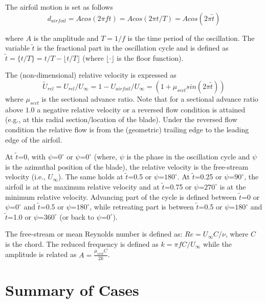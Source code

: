 The airfoil motion is set as follows
\begin{equation}
\label{eq:displacement}
  d_{airfoil} = A cos(2\pi f t) =  Acos(2\pi t/T) = Acos(2\pi\tilde{t})
\end{equation}

\noindent where $A$ is the amplitude and $T=1/f$ is the time period of the oscillation.
The variable $\tilde{t}$ is the fractional part in the oscillation cycle and is defined as $\tilde{t}=\{t/T\} = t/T - \lfloor t/T \rfloor$ (where $\lfloor \cdot \rfloor$ is the floor function).

The (non-dimensional) relative velocity is expressed as
\begin{equation}
\label{eq:relVelocity}
  \tilde{U}_{rel} = U_{rel}/U_\infty = 1 - U_{airfoil}/U_\infty = (1+\mu_{sect} sin(2\pi\tilde{t}))
\end{equation}
\noindent where $\mu_{sect}$ is the sectional advance ratio.
Note that for a sectional advance ratio above $1.0$ a negative relative velocity or a reversed flow condition is attained (e.g., at this radial section/location of the blade).
Under the reversed flow condition the relative flow is from the (geometric) trailing edge to the leading edge of the airfoil.

At $\tilde{t}$=0, with $\psi$=$0^\circ$ or $\psi$=$0^\circ$ (where, $\psi$ is the phase in the oscillation cycle and $\psi$ is the azimuthal position of the blade), the relative velocity is the free-stream velocity (i.e., $U_\infty$).
The same holds at $\tilde{t}$=0.5 or $\psi$=$180^\circ$.
At $\tilde{t}$=0.25 or $\psi$=$90^\circ$, the airfoil is at the maximum relative velocity and at $\tilde{t}$=0.75 or $\psi$=$270^\circ$ is at the minimum relative velocity.
Advancing part of the cycle is defined between $\tilde{t}$=0 or $\psi$=$0^\circ$ and $\tilde{t}$=0.5 or $\psi$=$180^\circ$, while retreating part is between $\tilde{t}$=0.5 or $\psi$=$180^\circ$ and $\tilde{t}$=1.0 or $\psi$=$360^\circ$ (or back to $\psi$=$0^\circ$).

The free-stream or mean Reynolds number is defined as: $Re=U_\infty C/\nu$, where $C$ is the chord.
The reduced frequency is defined as $k=\pi f C/U_\infty$ while the amplitude is related as $A = \frac{\mu_{sect} C}{2k}$.

\section{Summary of Cases}
\label{sec:baseline_case_summary}

